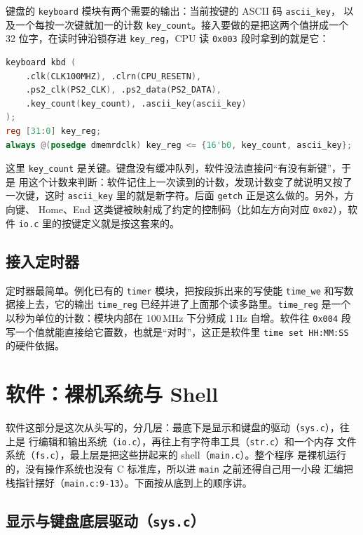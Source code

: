 \documentclass[12pt, a4paper]{ctexart}
\begin{document}
键盘的 \lstinline|keyboard| 模块有两个需要的输出：当前按键的 ASCII 码 \lstinline|ascii_key|，
以及一个每按一次键就加一的计数 \lstinline|key_count|。接入要做的是把这两个值拼成一个
32 位字，在读时钟沿锁存进 \lstinline|key_reg|，CPU 读 \lstinline|0x003| 段时拿到的就是它：

\begin{lstlisting}[language=Verilog]
keyboard kbd (
    .clk(CLK100MHZ), .clrn(CPU_RESETN),
    .ps2_clk(PS2_CLK), .ps2_data(PS2_DATA),
    .key_count(key_count), .ascii_key(ascii_key)
);
reg [31:0] key_reg;
always @(posedge dmemrdclk) key_reg <= {16'b0, key_count, ascii_key};
\end{lstlisting}

这里 \lstinline|key_count| 是关键。键盘没有缓冲队列，软件没法直接问“有没有新键”，于是
用这个计数来判断：软件记住上一次读到的计数，发现计数变了就说明又按了一次键，这时
\lstinline|ascii_key| 里的就是新字符。后面 \lstinline|getch| 正是这么做的。另外，方向键、
Home、End 这类键被映射成了约定的控制码（比如左方向对应 \lstinline|0x02|），软件
\lstinline|io.c| 里的按键定义就是按这套来的。

\subsection{接入定时器}

定时器最简单。例化已有的 \lstinline|timer| 模块，把按段拆出来的写使能 \lstinline|time_we|
和写数据接上去，它的输出 \lstinline|time_reg| 已经并进了上面那个读多路里。\lstinline|time_reg|
是一个以秒为单位的计数：模块内部在 100\,MHz 下分频成 1\,Hz 自增。软件往 \lstinline|0x004|
段写一个值就能直接给它置数，也就是“对时”，这正是软件里 \lstinline|time set HH:MM:SS|
的硬件依据。

\section{软件：裸机系统与 Shell}

软件这部分是这次从头写的，分几层：最底下是显示和键盘的驱动（\lstinline|sys.c|），往上是
行编辑和输出系统（\lstinline|io.c|），再往上有字符串工具（\lstinline|str.c|）和一个内存
文件系统（\lstinline|fs.c|），最上层是把这些拼起来的 shell（\lstinline|main.c|）。整个程序
是裸机运行的，没有操作系统也没有 C 标准库，所以进 \lstinline|main| 之前还得自己用一小段
汇编把栈指针摆好（\lstinline|main.c:9-13|）。下面按从底到上的顺序讲。

\subsection{显示与键盘底层驱动（\texttt{sys.c}）}
\end{document}
